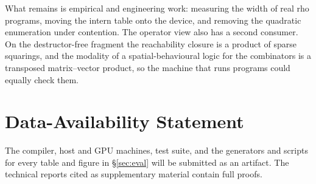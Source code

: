 \documentclass[acmsmall,screen,review,anonymous]{acmart}
\begin{document}
What remains is empirical and engineering work: measuring the width of real
rho programs, moving the intern table onto the device, and removing the
quadratic enumeration under contention. The operator view also has a
second consumer. On the destructor-free fragment the reachability closure is
a product of sparse squarings, and the modality of a spatial-behavioural logic
for the combinators is a transposed matrix--vector product, so the machine
that runs programs could equally check them.

\section*{Data-Availability Statement}
The compiler, host and GPU machines, test suite, and the generators and
scripts for every table and figure in \S\ref{sec:eval} will be submitted as an
artifact. The technical reports cited as supplementary material contain full
proofs.



\end{document}
